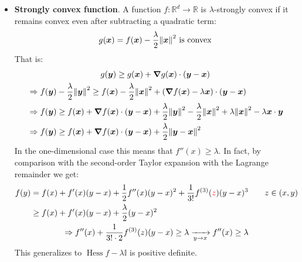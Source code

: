 \documentclass[../template.tex]{subfiles}
\begin{document}
\begin{itemize}
    \item \textbf{Strongly convex function}. A function $f\colon \mathbb{R}^d \to \mathbb{R}$ is $\lambda$-strongly convex if it remains convex even after subtracting a quadratic term:
    \begin{align}
        g(\bm{x}) = f(\bm{x}) - \frac{\lambda}{2} \norm{\bm{x}}^2  \text{ is convex} \label{eqn:strongly-convex-def}
    \end{align} 
    That is:
    \begin{align} \nonumber
        g(\bm{y}) \geq g(\bm{x}) + \grad g(\bm{x}) \cdot (\bm{y} - \bm{x}) \span \\ \nonumber
        &\Rightarrow f(\bm{y}) - \frac{\lambda}{2}\norm{\bm{y}}^2 \geq f(\bm{x}) - \frac{\lambda}{2}\norm{\bm{x}}^2 + (\grad f(\bm{x}) - \lambda\bm{x}) \cdot (\bm{y} - \bm{x})\\ \nonumber
        &\Rightarrow f(\bm{y}) \geq f(\bm{x}) + \grad f(\bm{x})\cdot  (\bm{y} - \bm{x})+ \frac{\lambda}{2} \norm{\bm{y}}^2  -\frac{\lambda}{2} \norm{\bm{x}}^2 +\lambda \norm{\bm{x}}^2 -\lambda \bm{x} \cdot \bm{y}  \\ 
        &\Rightarrow f(\bm{y}) \geq f(\bm{x}) + \grad f(\bm{x})\cdot  (\bm{y} - \bm{x}) + \frac{\lambda}{2} \norm{\bm{y}-\bm{x}}^2 
        \label{eqn:strongly-convex-def3}
    \end{align}  
    In the one-dimensional case this means that $f''(x) \geq \lambda$. In fact, by comparison with the second-order Taylor expansion with the Lagrange remainder we get:
    \begin{align*}
        f(y) &= f(x) + f'(x)(y-x) + \frac{1}{2} f''(x)(y-x)^2 + \frac{1}{3!}f^{(3)}(\textcolor{Red}{z})(y-x)^3   \qquad z \in (x,y)\\
        & \geq f(x) + f'(x)(y-x) + \frac{\lambda}{2} (y-x)^2 \\
        \Rightarrow f''(x) +\frac{1}{3! \cdot 2} f^{(3)}(z)(y-x) \geq \lambda  \xrightarrow[y \to x ]{ } f''(x) \geq \lambda  \span
    \end{align*}
    This generalizes to $\operatorname{Hess}f - \lambda \mathbb{I}$ is positive definite.
    \medskip


\end{itemize}
\end{document}
